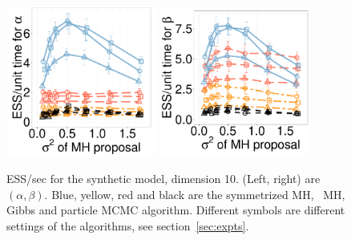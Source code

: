   \begin{figure}[H]
  \centering
  \begin{minipage}[h!]{0.99\linewidth}
  \centering
    \includegraphics [width=0.44\textwidth, angle=0]{figs/new_whole_exp_figs/exp_alpha_dim5.pdf}
    \includegraphics [width=0.44\textwidth, angle=0]{figs/new_whole_exp_figs/exp_beta_dim5.pdf}
  \end{minipage}
    \caption{ESS/sec for the synthetic  model, dimension 10. (Left, right) 
      are $(\alpha, \beta)$. Blue, yellow, red and black are the symmetrized MH,
  \naive\ MH, Gibbs and particle MCMC algorithm. Different symbols are
different settings of the algorithms, see section~\ref{sec:expts}.}
     \label{fig:ESS_EXP_D1010}
  \end{figure}

